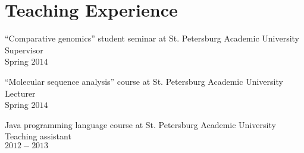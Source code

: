 \section{Teaching Experience}
``Comparative genomics'' student seminar at St. Petersburg Academic University\\
Supervisor\\
Spring $2014$

\blankline

``Molecular sequence analysis'' course at St. Petersburg Academic University\\
Lecturer\\
Spring $2014$

\blankline

Java programming language course at St. Petersburg Academic University\\
Teaching assistant\\ 
$2012-2013$



